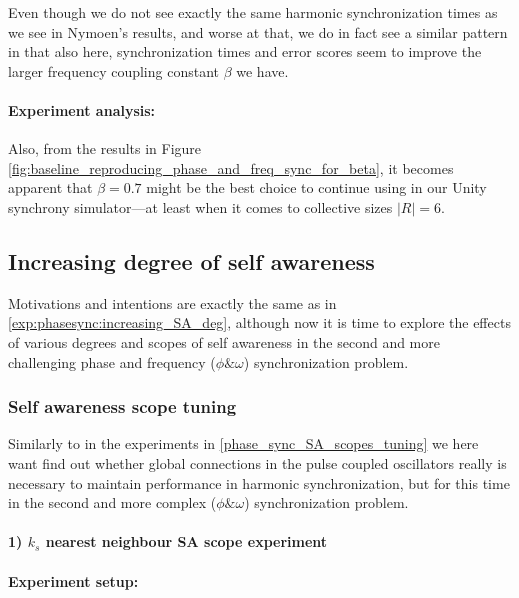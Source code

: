 		Even though we do not see exactly the same harmonic synchronization times as we see in Nymoen's results, and worse at that, we do in fact see a similar pattern in that also here, synchronization times and error scores seem to improve the larger frequency coupling constant $\beta$ we have.
		
		\paragraph{Experiment analysis:\nl}
		
		Also, from the results in Figure \ref{fig:baseline_reproducing_phase_and_freq_sync_for_beta}, it becomes apparent that $\beta=0.7$ might be the best choice to continue using in our Unity synchrony simulator—at least when it comes to collective sizes $|R|=6$.
		
	
	\subsection{Increasing degree of self awareness}
	\label{exp:phase_and_freq_sync:increasing_SA_deg}
	
	Motivations and intentions are exactly the same as in \ref{exp:phasesync:increasing_SA_deg}, although now it is time to explore the effects of various degrees and scopes of self awareness in the second and more challenging phase and frequency ($\phi \& \omega$) synchronization problem.
	
		\subsubsection{Self awareness scope tuning}
		\label{phase_and_freq_sync_SA_scopes_tuning}
		
		Similarly to in the experiments in \ref{phase_sync_SA_scopes_tuning} we here want find out whether global connections in the pulse coupled oscillators really is necessary to maintain performance in harmonic synchronization, but for this time in the second and more complex ($\phi \& \omega$) synchronization problem.
		
			\paragraph{1) $k_s$ nearest neighbour SA scope experiment\nl}
			
				\paragraph{Experiment setup:\nl}
			
